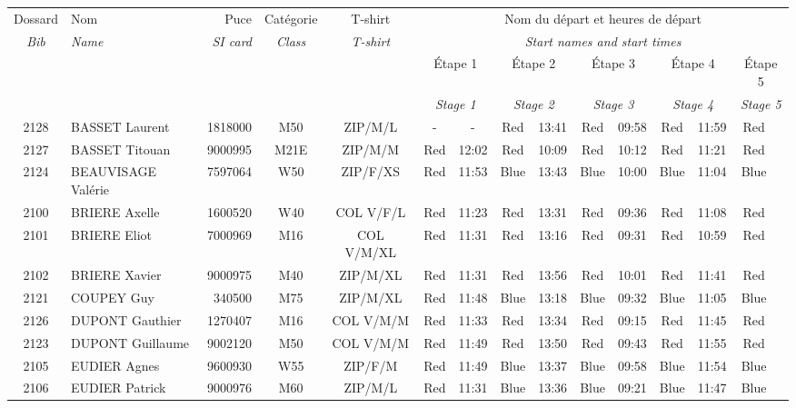 \documentclass{report}
\begin{document}
  \begin{longtable}{|c|l|r|c|c|*{5}{cc|}}
    Dossard & Nom  & Puce    & Catégorie & T-shirt & \multicolumn{10}{c|}{Nom du départ et heures de départ} \\
    \itshape Bib     & \itshape Name & \itshape SI card & \itshape Class  & \itshape  T-shirt  & \multicolumn{10}{c|}{\itshape Start names and start times} \\
    \hline
    & & & & & \multicolumn{2}{c|}{Étape 1} & \multicolumn{2}{c|}{Étape 2} & \multicolumn{2}{c|}{Étape 3} & \multicolumn{2}{c|}{Étape 4} & \multicolumn{2}{c|}{Étape 5} \\
    & & & & & \multicolumn{2}{c|}{\itshape Stage 1} & \multicolumn{2}{c|}{\itshape Stage 2} & \multicolumn{2}{c|}{\itshape Stage 3} & \multicolumn{2}{c|}{\itshape Stage 4} & \multicolumn{2}{c|}{\itshape Stage 5} \\
    \hline
    2128 & BASSET Laurent & 1818000 & M50 & ZIP/M/L & - &  - & Red & 13:41 & Red & 09:58 & Red & 11:59 & Red &  \\
    2127 & BASSET Titouan & 9000995 & M21E & ZIP/M/M & Red & 12:02 & Red & 10:09 & Red & 10:12 & Red & 11:21 & Red &  \\
    2124 & BEAUVISAGE Valérie & 7597064 & W50 & ZIP/F/XS & Red & 11:53 & Blue & 13:43 & Blue & 10:00 & Blue & 11:04 & Blue &  \\
    2100 & BRIERE Axelle & 1600520 & W40 & COL V/F/L & Red & 11:23 & Red & 13:31 & Red & 09:36 & Red & 11:08 & Red &  \\
    2101 & BRIERE Eliot & 7000969 & M16 & COL V/M/XL & Red & 11:31 & Red & 13:16 & Red & 09:31 & Red & 10:59 & Red &  \\
    2102 & BRIERE Xavier & 9000975 & M40 & ZIP/M/XL & Red & 11:31 & Red & 13:56 & Red & 10:01 & Red & 11:41 & Red &  \\
    2121 & COUPEY Guy & 340500 & M75 & ZIP/M/XL & Red & 11:48 & Blue & 13:18 & Blue & 09:32 & Blue & 11:05 & Blue &  \\
    2126 & DUPONT Gauthier & 1270407 & M16 & COL V/M/M & Red & 11:33 & Red & 13:34 & Red & 09:15 & Red & 11:45 & Red &  \\
    2123 & DUPONT Guillaume & 9002120 & M50 & COL V/M/M & Red & 11:49 & Red & 13:50 & Red & 09:43 & Red & 11:55 & Red &  \\
    2105 & EUDIER Agnes & 9600930 & W55 & ZIP/F/M & Red & 11:49 & Blue & 13:37 & Blue & 09:58 & Blue & 11:54 & Blue &  \\
    2106 & EUDIER Patrick & 9000976 & M60 & ZIP/M/L & Red & 11:31 & Blue & 13:36 & Blue & 09:21 & Blue & 11:47 & Blue &  \\

\end{longtable}
\end{document}
